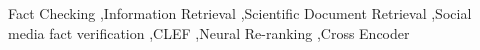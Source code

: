 \documentclass{ceurart}
\begin{document}
\begin{keywords}
  Fact Checking \sep Information Retrieval \sep Scientific Document Retrieval \sep Social media fact verification \sep CLEF \sep Neural Re-ranking \sep Cross Encoder
\end{keywords}

\maketitle





















\end{document}
